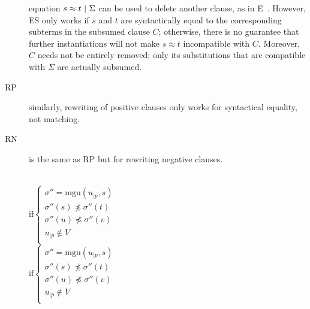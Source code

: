 \begin{description}
    equation $ s\approx t ~|~ \Sigma $ can be used to delete another clause, as
    in E~\cite{SS02}.
    However, ES only works if $s$ and $t$ are syntactically equal to the
    corresponding subterms in the subsumed clause $C$; otherwise, there is no
    guarantee that further instantiations will not make
    $s\approx t$ incompatible with $C$.
    Moreover, $C$ needs not be entirely removed; only its substitutions
    that are compatible with $\Sigma$ are actually subsumed.
  \item[RP] similarly, rewriting of positive clauses only  works for
    syntactical equality, not matching.
  \item[RN] is the same as RP but for rewriting negative clauses.
\end{description}

\begin{figure}[htb]
  \begin{center}

    \UIC{$\emptyset | \Sigma \circ \sigma $}
    \DP{} \\[12pt]

    \DP{}
    $\text{if} \left\{ \begin{array}{l}
        \sigma'' = \text{mgu}(u_{|p}, s) \\
        \sigma''(s) \not\preceq \sigma''(t) \\
        \sigma''(u) \not\preceq \sigma''(v) \\
        u_{|p} \not\in V \\
    \end{array}\right.$ \\[12pt]

    \DP{}
    $\text{if} \left\{ \begin{array}{l}
        \sigma'' = \text{mgu}(u_{|p}, s) \\
        \sigma''(s) \not\preceq \sigma''(t) \\
        \sigma''(u) \not\preceq \sigma''(v) \\
        u_{|p} \not\in V \\
    \end{array}\right.$ \\[12pt]


\end{center}
\end{figure}

